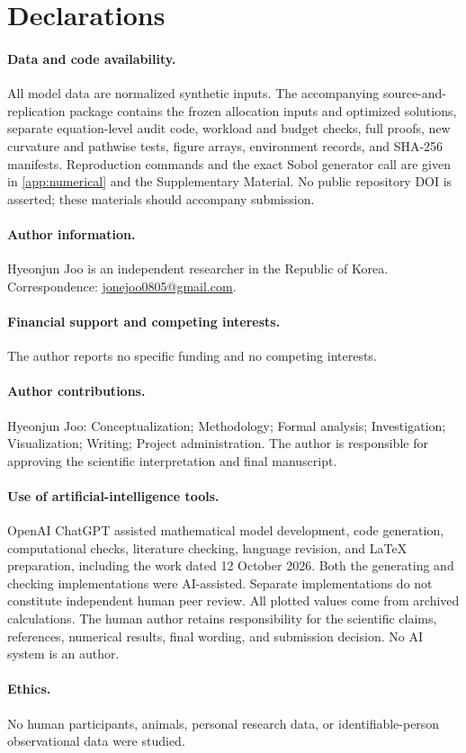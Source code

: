\section*{Declarations}

\paragraph{Data and code availability.} All model data are normalized synthetic inputs. The accompanying source-and-replication package contains the frozen allocation inputs and optimized solutions, separate equation-level audit code, workload and budget checks, full proofs, new curvature and pathwise tests, figure arrays, environment records, and SHA-256 manifests. Reproduction commands and the exact Sobol generator call are given in \cref{app:numerical} and the Supplementary Material. No public repository DOI is asserted; these materials should accompany submission.

\paragraph{Author information.} Hyeonjun Joo is an independent researcher in the Republic of Korea. Correspondence: \href{mailto:jonejoo0805@gmail.com}{jonejoo0805@gmail.com}.

\paragraph{Financial support and competing interests.} The author reports no specific funding and no competing interests.

\paragraph{Author contributions.} Hyeonjun Joo: Conceptualization; Methodology; Formal analysis; Investigation; Visualization; Writing; Project administration. The author is responsible for approving the scientific interpretation and final manuscript.

\paragraph{Use of artificial-intelligence tools.} OpenAI ChatGPT assisted mathematical model development, code generation, computational checks, literature checking, language revision, and LaTeX preparation, including the work dated 12 October 2026. Both the generating and checking implementations were AI-assisted. Separate implementations do not constitute independent human peer review. All plotted values come from archived calculations. The human author retains responsibility for the scientific claims, references, numerical results, final wording, and submission decision. No AI system is an author.

\paragraph{Ethics.} No human participants, animals, personal research data, or identifiable-person observational data were studied.

\appendix
